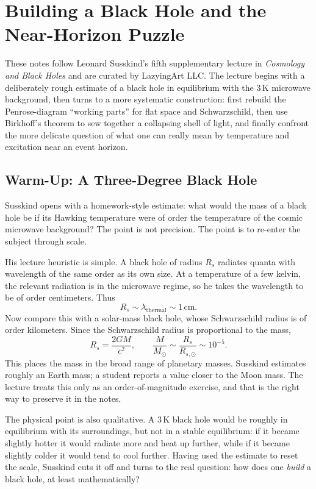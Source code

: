 \chapter{Building a Black Hole and the Near-Horizon Puzzle}

These notes follow Leonard Susskind's fifth supplementary lecture in \emph{Cosmology and Black Holes} and are curated by LazyingArt LLC. The lecture begins with a deliberately rough estimate of a black hole in equilibrium with the \(3\,\mathrm{K}\) microwave background, then turns to a more systematic construction: first rebuild the Penrose-diagram ``working parts'' for flat space and Schwarzschild, then use Birkhoff's theorem to sew together a collapsing shell of light, and finally confront the more delicate question of what one can really mean by temperature and excitation near an event horizon.

\section{Warm-Up: A Three-Degree Black Hole}

Susskind opens with a homework-style estimate: what would the mass of a black hole be if its Hawking temperature were of order the temperature of the cosmic microwave background? The point is not precision. The point is to re-enter the subject through scale.

His lecture heuristic is simple. A black hole of radius \(R_s\) radiates quanta with wavelength of the same order as its own size. At a temperature of a few kelvin, the relevant radiation is in the microwave regime, so he takes the wavelength to be of order centimeters. Thus
\begin{equation}
R_s \sim \lambda_{\text{thermal}} \sim 1\,\mathrm{cm}.
\end{equation}
Now compare this with a solar-mass black hole, whose Schwarzschild radius is of order kilometers. Since the Schwarzschild radius is proportional to the mass,
\begin{equation}
R_s=\frac{2GM}{c^2},
\qquad
\frac{M}{M_\odot}\sim \frac{R_s}{R_{s,\odot}} \sim 10^{-5}.
\end{equation}
This places the mass in the broad range of planetary masses. Susskind estimates roughly an Earth mass; a student reports a value closer to the Moon mass. The lecture treats this only as an order-of-magnitude exercise, and that is the right way to preserve it in the notes.

The physical point is also qualitative. A \(3\,\mathrm{K}\) black hole would be roughly in equilibrium with its surroundings, but not in a stable equilibrium: if it became slightly hotter it would radiate more and heat up further, while if it became slightly colder it would tend to cool further. Having used the estimate to reset the scale, Susskind cuts it off and turns to the real question: how does one \emph{build} a black hole, at least mathematically?

